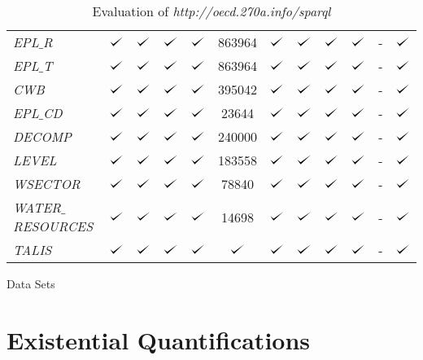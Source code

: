 \documentclass{llncs}
\def\checkmark{\tikz\fill[scale=0.4](0,.35) -- (.25,0) -- (1,.7) -- (.25,.15) -- cycle;}
\begin{document}
\begin{table}[H]
\begin{center}
\begin{tabular}{@{}lccccccccccc@{}}
    \emph{EPL$\_$R} & $\checkmark$ & $\checkmark$ & $\checkmark$ & $\checkmark$ & 863964 & $\checkmark$ & $\checkmark$ & $\checkmark$ & $\checkmark$ & - & $\checkmark$  \\
    \emph{EPL$\_$T} & $\checkmark$ & $\checkmark$ & $\checkmark$ & $\checkmark$ & 863964 & $\checkmark$ & $\checkmark$ & $\checkmark$ & $\checkmark$ & - & $\checkmark$  \\
    \emph{CWB} & $\checkmark$ & $\checkmark$ & $\checkmark$ & $\checkmark$ & 395042 & $\checkmark$ & $\checkmark$ & $\checkmark$ & $\checkmark$ & - & $\checkmark$  \\
    \emph{EPL$\_$CD} & $\checkmark$ & $\checkmark$ & $\checkmark$ & $\checkmark$ & 23644 & $\checkmark$ & $\checkmark$ & $\checkmark$ & $\checkmark$ & - & $\checkmark$  \\
    \emph{DECOMP} & $\checkmark$ & $\checkmark$ & $\checkmark$ & $\checkmark$ & 240000 & $\checkmark$ & $\checkmark$ & $\checkmark$ & $\checkmark$ & - & $\checkmark$  \\
    \emph{LEVEL} & $\checkmark$ & $\checkmark$ & $\checkmark$ & $\checkmark$ & 183558 & $\checkmark$ & $\checkmark$ & $\checkmark$ & $\checkmark$ & - & $\checkmark$  \\
    \emph{WSECTOR} & $\checkmark$ & $\checkmark$ & $\checkmark$ & $\checkmark$ & 78840 & $\checkmark$ & $\checkmark$ & $\checkmark$ & $\checkmark$ & - & $\checkmark$  \\
    \emph{WATER$\_$RESOURCES} & $\checkmark$ & $\checkmark$ & $\checkmark$ & $\checkmark$ & 14698 & $\checkmark$ & $\checkmark$ & $\checkmark$ & $\checkmark$ & - & $\checkmark$  \\
    \emph{TALIS} & $\checkmark$ & $\checkmark$ & $\checkmark$ & $\checkmark$ & $\checkmark$ & $\checkmark$ & $\checkmark$ & $\checkmark$ & $\checkmark$ & - & $\checkmark$  \\
    \bottomrule
    \end{tabular}
    \caption{Evaluation of \emph{http://oecd.270a.info/sparql}} Data Sets
    \label{tab:evaluation-7-oecd.270a.info-sparql}
    \end{center}
\end{table}

\section{Existential Quantifications}
\end{document}
